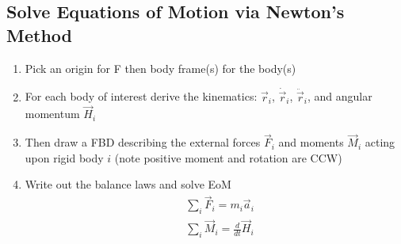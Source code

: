 \documentclass[conference]{IEEEtran}
\begin{document}
\subsection{Solve Equations of Motion via Newton's Method}
\begin{enumerate}
    \item Pick an origin for F then body frame(s) for the body(s)
    \item For each body of interest derive the kinematics: $\vec{r}_i$, $\dot{\vec{r}}_i$, $\ddot{\vec{r}}_i$, and angular momentum $\vec{H}_i$
    \item Then draw a FBD describing the external forces $\vec{F}_i$ and moments $\vec{M}_i$ acting upon rigid body $i$ (note positive moment and rotation are CCW)
    \item Write out the balance laws and solve EoM 
    \begin{align}
        & \sum_i \vec{F}_i = m_i \vec{a}_i \\
        & \sum_i \vec{M}_i = \frac{d}{dt}\vec{H}_i
    \end{align} 
\end{enumerate}
\end{document}
